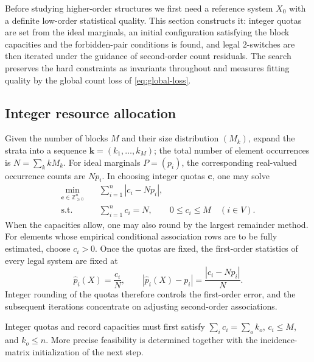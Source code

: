 \documentclass[11pt,a4paper]{article}
\numberwithin{equation}{section}
\theoremstyle{definition}
\numberwithin{algorithm}{section}
\begin{document}
Before studying higher-order structures we first need a reference system $X_0$ with a
definite low-order statistical quality.
This section constructs it: integer quotas are set from the ideal marginals, an initial
configuration satisfying the block capacities and the forbidden-pair conditions is found,
and legal $2$-switches are then iterated under the guidance of second-order count residuals.
The search preserves the hard constraints as invariants throughout and measures fitting
quality by the global count loss of \eqref{eq:global-loss}.

\subsection{Integer resource allocation}\label{subsec:baseline-budget}

Given the number of blocks $M$ and their size distribution $(M_k)$, expand the strata into
a sequence $\boldsymbol k=(k_1,\ldots,k_M)$; the total number of element occurrences is
$N=\sum_k kM_k$.
For ideal marginals $P=(p_i)$, the corresponding real-valued occurrence counts are $Np_i$.
In choosing integer quotas $\boldsymbol c$, one may solve
\begin{equation}
\begin{aligned}
\min_{\boldsymbol c\in\mathbb Z_{\ge0}^{n}}\quad&
\sum_{i=1}^{n}|c_i-Np_i|,\\
\mathrm{s.t.}\quad&
\sum_{i=1}^n c_i=N,\qquad 0\le c_i\le M\quad(i\in V).
\end{aligned}
\label{eq:baseline-margins}
\end{equation}
When the capacities allow, one may also round by the largest remainder method.
For elements whose empirical conditional association rows are to be fully estimated,
choose $c_i>0$.
Once the quotas are fixed, the first-order statistics of every legal system are fixed at
\begin{equation}
\widehat p_i(X)=\frac{c_i}{N},\qquad
\left|\widehat p_i(X)-p_i\right|
=\frac{|c_i-Np_i|}{N}.
\label{eq:baseline-margin-error}
\end{equation}
Integer rounding of the quotas therefore controls the first-order error, and the subsequent
iterations concentrate on adjusting second-order associations.

Integer quotas and record capacities must first satisfy
$\sum_i c_i=\sum_o k_o$, $c_i\le M$, and $k_o\le n$.
More precise feasibility is determined together with the incidence-matrix initialization
of the next step.
\end{document}
